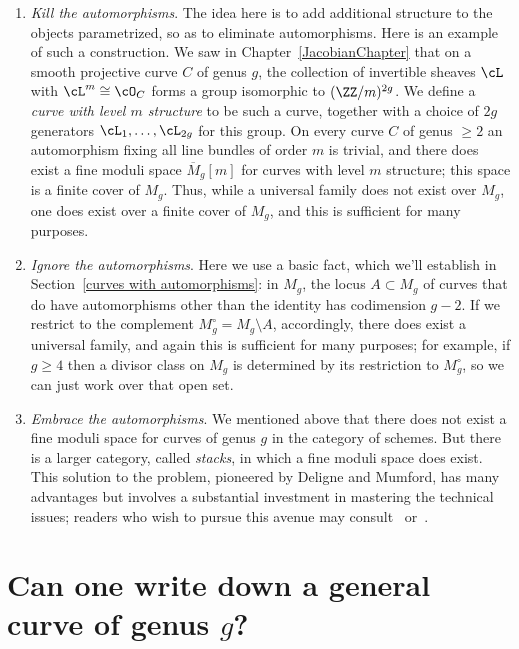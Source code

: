 \begin{enumerate}
\item \emph{Kill the automorphisms}. The idea here is to add additional structure to the objects parametrized, so as to eliminate automorphisms. Here is an example of such a construction. We saw in Chapter~\ref{JacobianChapter} that on a smooth projective curve $C$ of genus $g$, the collection of invertible sheaves $\cL$ with $\cL^m \cong \cO_C$ forms a group isomorphic to $(\ZZ/m)^{2g}$. We define a \emph{curve with level $m$ structure} to be such a curve, together with a choice of $2g$ generators $\cL_1,\dots,\cL_{2g}$ for this group. On every curve $C$ of genus $\geq 2$ an automorphism fixing all line bundles of order $m$ is trivial,  and there does 
exist a fine moduli space $\overline M_g[m]$ for curves with level $m$ structure; this space is a finite cover of $M_g$. Thus, while a universal family does not exist over $M_g$, one does exist over a finite cover of $M_g$, and this is sufficient for many purposes.

\item \emph {Ignore the automorphisms}.
Here we use a basic fact, which we'll establish in Section~\ref{curves with automorphisms}: in $M_g$, the locus $A \subset M_g$ of curves that do have automorphisms other than the identity has codimension $g-2$. If we restrict to the complement $M_g^\circ = M_g \setminus A$, accordingly, there does exist a universal family, and again this is sufficient for many purposes; for example, if $g \geq 4$ then a divisor class on $M_g$ is determined by its restriction to $M_g^\circ$, so we can just work over that open set.

\item \emph{Embrace the automorphisms}. We mentioned above that there does not exist a fine moduli space for curves of genus $g$ in the category of schemes. But there is a larger category, called \emph{stacks}, in which a fine moduli space does exist. This solution to the problem, pioneered by Deligne and Mumford, has
many advantages but involves a substantial investment in mastering the technical issues; readers who wish to pursue this avenue may consult~\cite{Deligne-Mumford} or~\cite{Olsson}.
\end{enumerate} 

\section{Can one write down a general curve of genus $g$?}\label{mgunirational}

